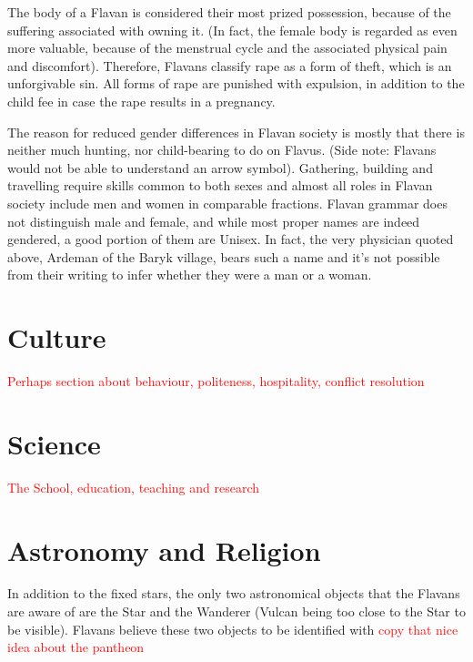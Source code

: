 \documentclass[10pt,oneside]{memoir}
\newcommand{\cmmnt}[1]{\textcolor{red}{#1}}
\begin{document}
The body of a Flavan is considered their most prized possession, because of the suffering associated with owning it. (In fact, the female body is regarded as even more valuable, because of the menstrual cycle and the associated physical pain and discomfort). Therefore, Flavans classify rape as a form of theft, which is an unforgivable sin. All forms of rape are punished with expulsion, in addition to the child fee in case the rape results in a pregnancy.

The reason for reduced gender differences in Flavan society is mostly that there is neither much hunting, nor child-bearing to do on Flavus. (Side note: Flavans would not be able to understand an arrow symbol). Gathering, building and travelling require skills common to both sexes and almost all roles in Flavan society include men and women in comparable fractions. Flavan grammar does not distinguish male and female, and while most proper names are indeed gendered, a good portion of them are Unisex. In fact, the very physician quoted above, Ardeman of the Baryk village, bears such a name and it's not possible from their writing to infer whether they were a man or a woman.

\pagebreak

\section{Culture}


\cmmnt{Perhaps section about behaviour, politeness, hospitality, conflict resolution}

\pagebreak

\section{Science}

\cmmnt{The School, education, teaching and research}

\pagebreak

\section{Astronomy and Religion}

In addition to the fixed stars, the only two astronomical objects that the Flavans are aware of are the Star and the Wanderer (Vulcan being too close to the Star to be visible). Flavans believe these two objects to be identified with \cmmnt{copy that nice idea about the pantheon}
\end{document}
